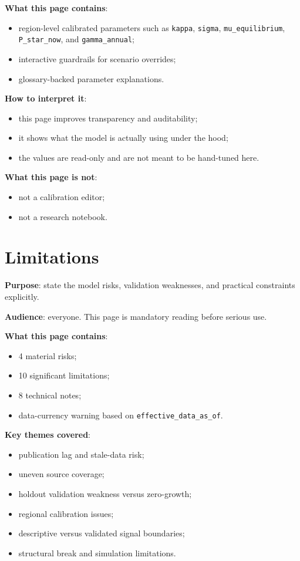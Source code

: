 \documentclass[11pt,a4paper]{article}
\begin{document}
\textbf{What this page contains}:
\begin{itemize}[leftmargin=1.5em]
  \item region-level calibrated parameters such as \texttt{kappa}, \texttt{sigma}, \texttt{mu\_equilibrium}, \texttt{P\_star\_now}, and \texttt{gamma\_annual};
  \item interactive guardrails for scenario overrides;
  \item glossary-backed parameter explanations.
\end{itemize}

\textbf{How to interpret it}:
\begin{itemize}[leftmargin=1.5em]
  \item this page improves transparency and auditability;
  \item it shows what the model is actually using under the hood;
  \item the values are read-only and are not meant to be hand-tuned here.
\end{itemize}

\textbf{What this page is not}:
\begin{itemize}[leftmargin=1.5em]
  \item not a calibration editor;
  \item not a research notebook.
\end{itemize}

\section{Limitations}

\textbf{Purpose}: state the model risks, validation weaknesses, and practical
constraints explicitly.

\textbf{Audience}: everyone. This page is mandatory reading before serious use.

\textbf{What this page contains}:
\begin{itemize}[leftmargin=1.5em]
  \item 4 material risks;
  \item 10 significant limitations;
  \item 8 technical notes;
  \item data-currency warning based on \texttt{effective\_data\_as\_of}.
\end{itemize}

\textbf{Key themes covered}:
\begin{itemize}[leftmargin=1.5em]
  \item publication lag and stale-data risk;
  \item uneven source coverage;
  \item holdout validation weakness versus zero-growth;
  \item regional calibration issues;
  \item descriptive versus validated signal boundaries;
  \item structural break and simulation limitations.
\end{itemize}
\end{document}
